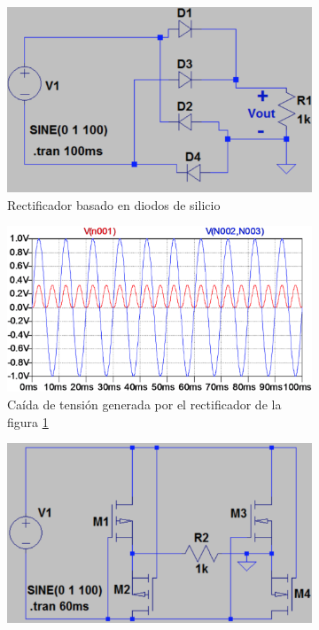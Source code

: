 \begin{figure}[h!]
	\begin{subfigure}{.5\textwidth}
		\centering
		\includegraphics[width=.8\linewidth]{Figures/YILMAZ_silicon_diode_rectifier}  
		\caption{Rectificador basado en diodos de silicio}
		\label{fig:rect_diodos}
	\end{subfigure}
	\begin{subfigure}{.5\textwidth}
		\centering
		\includegraphics[width=.8\linewidth]{Figures/onda_silicon_rectifier}  
		\caption{Caída de tensión generada por el rectificador de la figura \ref{fig:rect_diodos}}
		\label{fig:onda_rectificador_diodos}
	\end{subfigure}
	\newline
	\begin{subfigure}{.5\textwidth}
		\centering
		\includegraphics[width=.8\linewidth]{Figures/YILMAZ_passive_MOSFET_rectifier}  

\end{subfigure}
\end{figure}
